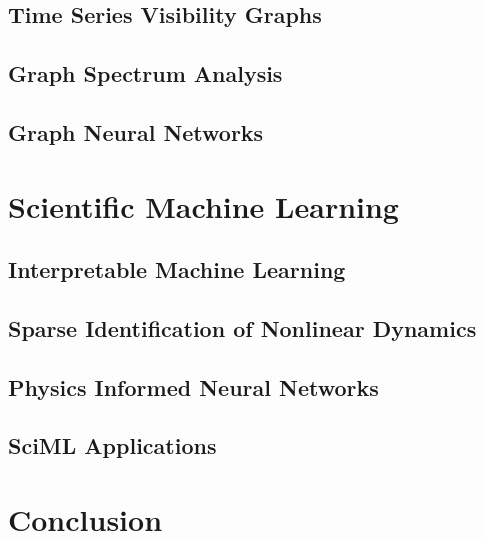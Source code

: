 \documentclass[doublespacing]{utdthesis}
\begin{document}
\section{Time Series Visibility Graphs}
\label{s:visibility}
\section{Graph Spectrum Analysis}
\label{s:spectrum}
\section{Graph Neural Networks}
\label{s:gnn}

\chapter{Scientific Machine Learning}
\label{c:sciml}
\section{Interpretable Machine Learning }
\label{s:interpretable}
\section{Sparse Identification of Nonlinear Dynamics}
\label{s:sindy}
\section{Physics Informed Neural Networks}
\label{s:pinn}
\section{SciML Applications}
\label{s:sciml applications}



\chapter{Conclusion}
\label{c:conclusion}

\appendix %


\begin{thesisbib}  %

\end{thesisbib}  %
\end{document}
